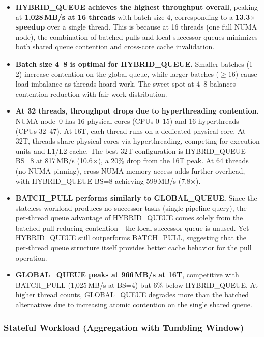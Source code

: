 \begin{itemize}
    \item \textbf{HYBRID\_QUEUE achieves the highest throughput overall}, peaking at \textbf{1,028\,MB/s at 16 threads} with batch size 4, corresponding to a \textbf{13.3$\times$ speedup} over a single thread.
    This is because at 16 threads (one full NUMA node), the combination of batched pulls and local successor queues minimizes both shared queue contention and cross-core cache invalidation.

    \item \textbf{Batch size 4--8 is optimal for HYBRID\_QUEUE.}
    Smaller batches (1--2) increase contention on the global queue, while larger batches ($\geq 16$) cause load imbalance as threads hoard work.
    The sweet spot at 4--8 balances contention reduction with fair work distribution.

    \item \textbf{At 32 threads, throughput drops due to hyperthreading contention.}
    NUMA node~0 has 16 physical cores (CPUs 0--15) and 16 hyperthreads (CPUs 32--47).
    At 16T, each thread runs on a dedicated physical core.
    At 32T, threads share physical cores via hyperthreading, competing for execution units and L1/L2 cache.
    The best 32T configuration is HYBRID\_QUEUE BS=8 at 817\,MB/s (10.6$\times$), a 20\% drop from the 16T peak.
    At 64 threads (no NUMA pinning), cross-NUMA memory access adds further overhead, with HYBRID\_QUEUE BS=8 achieving 599\,MB/s (7.8$\times$).

    \item \textbf{BATCH\_PULL performs similarly to GLOBAL\_QUEUE.}
    Since the stateless workload produces no successor tasks (single-pipeline query), the per-thread queue advantage of HYBRID\_QUEUE comes solely from the batched pull reducing contention---the local successor queue is unused.
    Yet HYBRID\_QUEUE still outperforms BATCH\_PULL, suggesting that the per-thread queue structure itself provides better cache behavior for the pull operation.

    \item \textbf{GLOBAL\_QUEUE peaks at 966\,MB/s at 16T}, competitive with BATCH\_PULL (1,025\,MB/s at BS=4) but 6\% below HYBRID\_QUEUE.
    At higher thread counts, GLOBAL\_QUEUE degrades more than the batched alternatives due to increasing atomic contention on the single shared queue.
\end{itemize}

\subsubsection{Stateful Workload (Aggregation with Tumbling Window)}

